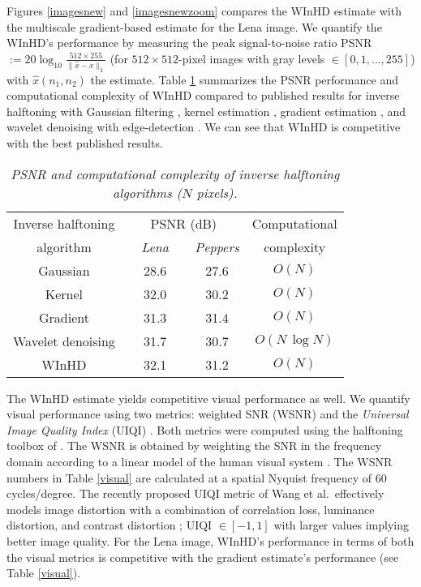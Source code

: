 \documentclass[11pt]{article}
\def\nnnx {n_1}
\def\nnny {n_2}
\def\NtimesN{N}
\def\NSQ{N}
\begin{document}
\sloppy Figures \ref{imagesnew} and \ref{imagesnewzoom} compares the
\mbox{WInHD} estimate with the multiscale gradient-based estimate
\cite{gradient_halftoning} for the Lena image. We quantify the
\mbox{WInHD}'s performance by measuring the peak signal-to-noise ratio
PSNR $:= 20\log_{10}{\frac{512\times255}{\|\widehat{x}-x\|_2}}$ (for
$512 \times 512$-pixel images with gray levels $\in [0,1,\ldots,255]$)
with $\widehat{x}(\nnnx,\nnny)$ the estimate. Table \ref{table}
summarizes the PSNR performance and computational complexity of
\mbox{WInHD} compared to published results for inverse halftoning with
Gaussian filtering \cite{Gaussian-LPF-halftoning}, kernel estimation
\cite{kernel_halftoning}, gradient estimation
\cite{gradient_halftoning}, and wavelet denoising with edge-detection
\cite{Xiong}. We can see that \mbox{WInHD} is competitive with the
best published results.
\begin{table}[tb]
\begin{center}
\caption{ \small \sl {PSNR and computational complexity of inverse halftoning algorithms ($\NtimesN$ pixels).}}
\vspace*{2mm}
\begin{tabular}{|c|c|c|c|}
\hline 
Inverse halftoning & \multicolumn{2}{c|}{PSNR (dB)}& Computational \\\cline{2-3}
algorithm&{\em ~~Lena~~} & {\em Peppers}&complexity \\
\hline
Gaussian \cite{Gaussian-LPF-halftoning} & 28.6 & 27.6 &$O(\NSQ )$\\
\hline
Kernel \cite{kernel_halftoning}& 32.0 & 30.2 &$O(\NSQ  )$\\
\hline
Gradient \cite{gradient_halftoning} & 31.3 & 31.4&$O(\NSQ  )$\\
\hline
Wavelet denoising \cite{Xiong} & 31.7 & 30.7&$O(\NSQ  \,\log{N})$\\
\hline
\mbox{WInHD} & 32.1 & 31.2&$O(\NSQ)$\\\hline
\end{tabular}
\label{table}
\end{center}
\end{table}

The \mbox{WInHD} estimate yields competitive visual performance as
well. We quantify visual performance using two metrics: weighted SNR
(WSNR) \cite{Mitsa,imagequality} and the {\em Universal Image Quality
Index} (UIQI) \cite{Bovik}. Both metrics were computed using the
halftoning toolbox of \cite{httoolbox}. The WSNR is obtained by
weighting the SNR in the frequency domain according to a linear model
of the human visual system \cite{Mitsa,imagequality}. The WSNR numbers
in Table \ref{visual} are calculated at a
spatial Nyquist frequency of 60 cycles/degree.  The recently proposed
UIQI metric of Wang et al.\ effectively models image distortion with a
combination of correlation loss, luminance distortion, and contrast
distortion \cite{Bovik}; UIQI $\in [-1,1]$ with larger values implying
better image quality. For the Lena image, \mbox{WInHD}'s
performance in terms of both the visual metrics is competitive with
the gradient estimate's performance (see Table \ref{visual}).
\end{document}
